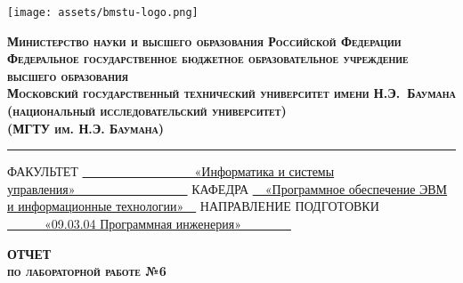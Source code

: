 \begin{titlepage}
	
	\fontsize{12pt}{12pt}\selectfont
	
	\noindent \begin{minipage}{0.13\textwidth}
		\texttt{[image: assets/bmstu-logo.png]}
	\end{minipage}
	\noindent\begin{minipage}{0.85\textwidth}\centering
		\textbf{\textsc{Министерство науки и высшего образования Российской Федерации}}\\
		\textbf{\textsc{Федеральное государственное бюджетное образовательное 	учреждение высшего образования}}\\
		\textbf{\textsc{Московский государственный технический университет имени 	Н.Э.~Баумана}}\\
		\textbf{\textsc{(национальный исследовательский университет)}}\\
		\textbf{\textsc{(МГТУ им. Н.Э. Баумана)}}\\
	\end{minipage}
	
	\noindent\rule{18cm}{1.5pt}
	
	\vspace{8mm}
	
	\noindent\textnormal{ФАКУЛЬТЕТ}\hspace{5mm} \underline{\textnormal{~~~~~~~~~~~~~~~~~~«Информатика и системы управления»~~~~~~~~~~~~~~~~~~}} \newline\newline
	\textnormal{КАФЕДРА}\hspace{5mm} \underline{\textnormal{~~«Программное обеспечение ЭВМ и информационные технологии»~~}}
	\newline\newline
	\textnormal{НАПРАВЛЕНИЕ ПОДГОТОВКИ}\hspace{5mm} \underline{\textnormal{~~~~~~«09.03.04 Программная инженерия»~~~~~~~~}}
	
	\vspace{2.5cm}
	
	\begin{center}
		\Large\textbf{\textsc{ОТЧЕТ}}\\
		\Large\textbf{\textsc{по лабораторной работе №6}}\\
	\end{center}
	
	\vspace{1cm}
	

\end{titlepage}
